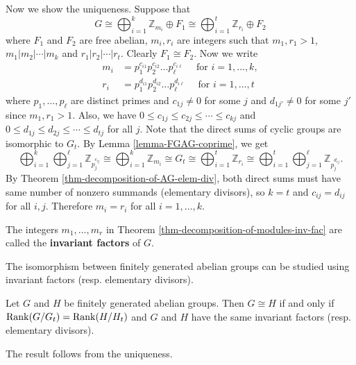 \begin{sketch}
	Now we show the uniqueness. Suppose that \begin{equation*}
		G \cong \bigoplus_{i=1}^{k} \mathbb{Z}_{m_i} \oplus F_1 \cong \bigoplus_{i=1}^t \mathbb{Z}_{r_i} \oplus F_2
	\end{equation*}
	where $F_1$ and $F_2$ are free abelian, $m_i,r_i$ are integers such that $m_1,r_1>1$, $m_1|m_2|\cdots| m_k$ and $r_1|r_2|\cdots | r_t$. Clearly $F_1 \cong F_2$. Now we write
	\begin{align*}
		m_i &= p_1^{c_{i1}} p_2^{c_{i2}} \dots p_\ell^{c_{i\ell}} \quad \text{ for } i=1,\dots, k,
		\\
		r_i &= p_1^{d_{i1}} p_2^{d_{i2}} \dots p_\ell^{d_{i\ell}} \quad \text{ for } i=1,\dots, t
	\end{align*}
	where $p_1,\dots, p_\ell$ are distinct primes and $c_{1j} \neq 0$ for some $j$ and $d_{1j'}\neq 0$ for some $j'$ since $m_1,r_1>1$. Also, we have $0\leq c_{1j} \leq c_{2j} \leq \cdots \leq c_{kj}$ and $0\leq d_{1j} \leq d_{2j} \leq \cdots \leq d_{tj}$ for all $j$. Note that the direct sums of cyclic groups are isomorphic to $G_t$. By Lemma \ref{lemma-FGAG-coprime}, we get
	\begin{equation*}
		\bigoplus_{i=1}^{k}  \bigoplus_{j=1}^{\ell} \mathbb{Z}_{p_j^{c_{ij}}} \cong \bigoplus_{i=1}^k \mathbb{Z}_{m_i} \cong G_t \cong \bigoplus_{i=1}^t \mathbb{Z}_{r_i} \cong \bigoplus_{i=1}^{t}  \bigoplus_{j=1}^{\ell} \mathbb{Z}_{p_j^{d_{ij}}}.
	\end{equation*}
	By Theorem \ref{thm-decomposition-of-AG-elem-div}, both direct sums must have same number of nonzero summands (elementary divisors), so $k = t$ and $c_{ij} = d_{ij}$ for all $i,j$. Therefore $m_i = r_i$ for all $i = 1,\dots, k$.
\end{sketch}
\begin{definition}
	The integers $m_1,\dots, m_r$ in Theorem \ref{thm-decomposition-of-modules-inv-fac} are called the \textbf{invariant factors} of $G$.
\end{definition}
The isomorphism between finitely generated abelian groups can be studied using invariant factors (resp. elementary divisors).
\begin{corollary}
	Let $G$ and $H$ be finitely generated abelian groups. Then $G\cong H$ if and only if $\operatorname{Rank} (G/ G_t)=\operatorname{Rank} (H/ H_t)$ and $G$ and $H$ have
	the same invariant factors (resp. elementary divisors). 
\end{corollary}
\begin{sketch}
	The result follows from the uniqueness.
\end{sketch}

